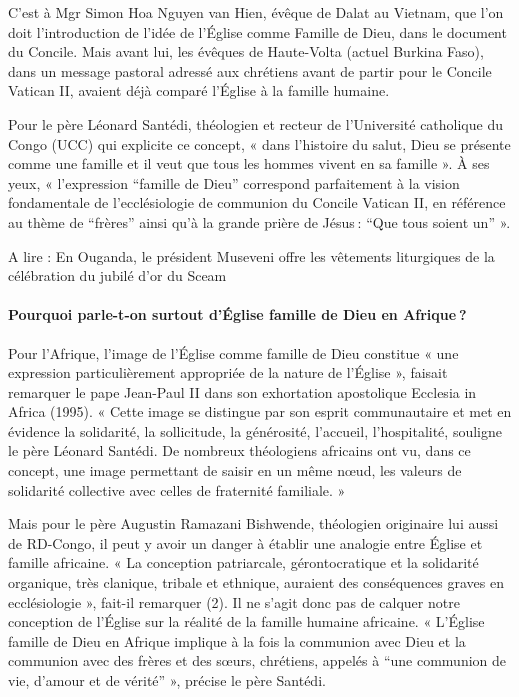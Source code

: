 C’est à Mgr Simon Hoa Nguyen van Hien, évêque de Dalat au Vietnam, que l’on doit l’introduction de l’idée de l’Église comme Famille de Dieu, dans le document du Concile. Mais avant lui, les évêques de Haute-Volta (actuel Burkina Faso), dans un message pastoral adressé aux chrétiens avant de partir pour le Concile Vatican II, avaient déjà comparé l’Église à la famille humaine.

Pour le père Léonard Santédi, théologien et recteur de l’Université catholique du Congo (UCC) qui explicite ce concept, « dans l’histoire du salut, Dieu se présente comme une famille et il veut que tous les hommes vivent en sa famille ». À ses yeux, « l’expression “famille de Dieu” correspond parfaitement à la vision fondamentale de l’ecclésiologie de communion du Concile Vatican II, en référence au thème de “frères” ainsi qu’à la grande prière de Jésus : “Que tous soient un” ».

A lire : En Ouganda, le président Museveni offre les vêtements liturgiques de la célébration du jubilé d’or du Sceam

\paragraph{Pourquoi parle-t-on surtout d’Église famille de Dieu en Afrique ?} 
Pour l’Afrique, l’image de l’Église comme famille de Dieu constitue « une expression particulièrement appropriée de la nature de l’Église », faisait remarquer le pape Jean-Paul II dans son exhortation apostolique Ecclesia in Africa (1995). « Cette image se distingue par son esprit communautaire et met en évidence la solidarité, la sollicitude, la générosité, l’accueil, l’hospitalité, souligne le père Léonard Santédi. De nombreux théologiens africains ont vu, dans ce concept, une image permettant de saisir en un même nœud, les valeurs de solidarité collective avec celles de fraternité familiale. »

Mais pour le père Augustin Ramazani Bishwende, théologien originaire lui aussi de RD-Congo, il peut y avoir un danger à établir une analogie entre Église et famille africaine. « La conception patriarcale, gérontocratique et la solidarité organique, très clanique, tribale et ethnique, auraient des conséquences graves en ecclésiologie », fait-il remarquer (2). Il ne s’agit donc pas de calquer notre conception de l’Église sur la réalité de la famille humaine africaine. « L’Église famille de Dieu en Afrique implique à la fois la communion avec Dieu et la communion avec des frères et des sœurs, chrétiens, appelés à “une communion de vie, d’amour et de vérité” », précise le père Santédi.

